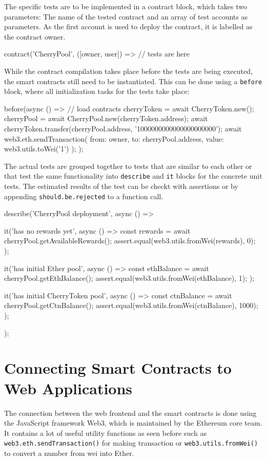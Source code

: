 The specific tests are to be implemented in a contract block, which takes two parameters: The name of the tested contract and an array of test accounts as parameters. As the first account is used to deploy the contract, it is labelled as the contract owner.

\begin{JsCode}
contract('CherryPool', ([owner, user]) => {
	// tests are here
}	
\end{JsCode}

While the contract compilation takes place before the tests are being executed, the smart contracts still need to be instantiated. This can be done using a \texttt{before} block, where all initialization tasks for the tests take place:

\begin{JsCode}
before(async () => {
  // load contracts
  cherryToken = await CherryToken.new();
  cherryPool = await CherryPool.new(cherryToken.address);
  await cherryToken.transfer(cherryPool.address, '1000000000000000000000');
  await web3.eth.sendTransaction({ from: owner, to: cherryPool.address, value: web3.utils.toWei('1') });
});	
\end{JsCode}

The actual tests are grouped together to tests that are similar to each other or that test the same functionality into \texttt{describe} and \texttt{it} blocks for the concrete unit tests. The estimated results of the test can be checkt with assertions or by appending \texttt{should.be.rejected} to a function call.

\begin{JsCode}
describe('CherryPool deployment', async () => {
  it('has no rewards yet', async () => {
    const rewards = await cherryPool.getAvailableRewards();
    assert.equal(web3.utils.fromWei(rewards), 0);
  });

  it('has initial Ether pool', async () => {
    const ethBalance = await cherryPool.getEthBalance();
    assert.equal(web3.utils.fromWei(ethBalance), 1);
  });

  it('has initial CherryToken pool', async () => {
    const ctnBalance = await cherryPool.getCtnBalance();
    assert.equal(web3.utils.fromWei(ctnBalance), 1000);
  });
});
\end{JsCode}

\section{Connecting Smart Contracts to Web Applications}
The connection between the web frontend and the smart contracts is done using the JavaScript framework Web3\cite{Web3}, which is maintained by the Ethereum core team. It contains a lot of useful utility functions as seen before such as \texttt{web3.eth.sendTransaction()} for making transaction or \texttt{web3.utils.fromWei()} to convert a number from wei into Ether.

